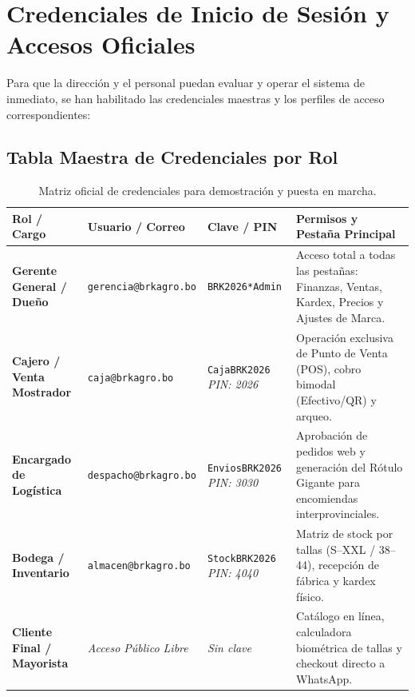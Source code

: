 \documentclass[11pt,a4paper]{article}
\begin{document}
\newpage

\section{Credenciales de Inicio de Sesión y Accesos Oficiales}

Para que la dirección y el personal puedan evaluar y operar el sistema de inmediato, se han habilitado las credenciales maestras y los perfiles de acceso correspondientes:

\subsection{Tabla Maestra de Credenciales por Rol}

\begin{table}[h!]
\centering
\small
\begin{tabularx}{\linewidth}{p{3.5cm} p{3.8cm} p{2.6cm} X}
\toprule
\textbf{Rol / Cargo} & \textbf{Usuario / Correo} & \textbf{Clave / PIN} & \textbf{Permisos y Pestaña Principal} \\
\midrule
\textbf{Gerente General / Dueño} & \texttt{gerencia@brkagro.bo} & \texttt{BRK2026*Admin} & Acceso total a todas las pestañas: Finanzas, Ventas, Kardex, Precios y Ajustes de Marca. \\
\addlinespace
\textbf{Cajero / Venta Mostrador} & \texttt{caja@brkagro.bo} & \texttt{CajaBRK2026} \newline \textit{PIN: 2026} & Operación exclusiva de Punto de Venta (POS), cobro bimodal (Efectivo/QR) y arqueo. \\
\addlinespace
\textbf{Encargado de Logística} & \texttt{despacho@brkagro.bo} & \texttt{EnviosBRK2026} \newline \textit{PIN: 3030} & Aprobación de pedidos web y generación del Rótulo Gigante para encomiendas interprovinciales. \\
\addlinespace
\textbf{Bodega / Inventario} & \texttt{almacen@brkagro.bo} & \texttt{StockBRK2026} \newline \textit{PIN: 4040} & Matriz de stock por tallas (S--XXL / 38--44), recepción de fábrica y kardex físico. \\
\addlinespace
\textbf{Cliente Final / Mayorista} & \textit{Acceso Público Libre} & \textit{Sin clave} & Catálogo en línea, calculadora biométrica de tallas y checkout directo a WhatsApp. \\
\bottomrule
\end{tabularx}
\caption{Matriz oficial de credenciales para demostración y puesta en marcha.}
\end{table}
\end{document}

